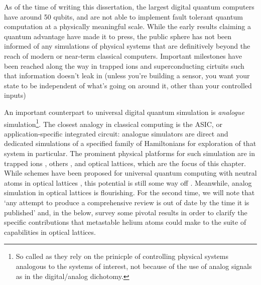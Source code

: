 	As of the time of writing this dissertation, the largest digital quantum computers have around 50 qubits, and are not able to implement fault tolerant quantum computation at a physically meaningful scale.
	While the early results claiming a quantum advantage have made it to press, the public sphere has not been informed of any simulations of physical systems that are definitively beyond the reach of modern or near-term classical computers.
	Important milestones have been reached along the way in trapped ions \cite{} and superconducting cirtuits \cite{}
	such that information doesn't leak in (unless you're building a sensor, you want your state to be independent of what's going on around it, other than your controlled inputs)

	An important counterpart to universal digital quantum simulation is \emph{analogue} simulation\footnote{So called as they rely on the prinicple of controlling physical systems analogous to the systems of interest, not because of the use of analog signals as in the digital/analog dichotomy.}.
	The closest analogy in classical computing is the ASIC, or application-specific integrated circuit: analogue simulators are direct and dedicated simulations of a specified family of Hamiltonians for exploration of that system in particular.
	The prominent physical platforms for such simulation are in trapped ions \cite{}, others \cite{}, and optical lattices, which are the focus of this chapter.
	While schemes have been proposed for universal quantum computing with neutral atoms in optical lattices \cite{brennen99,henriet20}, this potential is still some way off \cite{markov00}.
	Meanwhile, analog simulation in optical lattices is flourishing.
	For the second time, we will note that `any attempt to produce a comprehensive review is out of date by the time it is published' and, in the below, survey some pivotal results in order to clarify the specific contributions that metastable helium atoms could make to the suite of capabilities in optical lattices.

